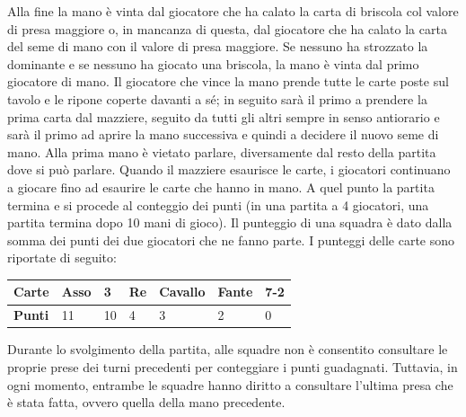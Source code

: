 \documentclass[a4paper,12pt]{article}
\begin{document}
Alla fine la mano è vinta dal giocatore che ha calato la carta di briscola col valore di presa maggiore o, in mancanza di questa, dal giocatore che ha calato la carta del seme di mano con il valore di presa maggiore. Se nessuno ha strozzato la dominante e se nessuno ha giocato una briscola, la mano è vinta dal primo giocatore di mano. Il giocatore che vince la mano prende tutte le carte poste sul tavolo e le ripone coperte davanti a sé; in seguito sarà il primo a prendere la prima carta dal mazziere, seguito da tutti gli altri sempre in senso antiorario e sarà il primo ad aprire la mano successiva e quindi a decidere il nuovo seme di mano. Alla prima mano è vietato parlare, diversamente dal resto della partita dove si può parlare. Quando il mazziere esaurisce le carte, i giocatori continuano a giocare fino ad esaurire le carte che hanno in mano. A quel punto la partita termina e si procede al conteggio dei punti (in una partita a 4 giocatori, una partita termina dopo 10 mani di gioco). Il punteggio di una squadra è dato dalla somma dei punti dei due giocatori che ne fanno parte. I punteggi delle carte sono riportate di seguito:

\begin{center}
	\begin{tabular}{| l | l | l | l | l | l | l |}
		\hline
		\textbf{Carte} & Asso & 3 & Re & Cavallo & Fante & 7-2 \\ \hline
		\textbf{Punti} & 11 & 10 & 4 & 3 & 2 & 0 \\ 
		\hline
	\end{tabular}
\end{center}

Durante lo svolgimento della partita, alle squadre non è consentito consultare le proprie prese dei turni precedenti per conteggiare i punti guadagnati. Tuttavia, in ogni momento, entrambe le squadre hanno diritto a consultare l'ultima presa che è stata fatta, ovvero quella della mano precedente.
\end{document}
